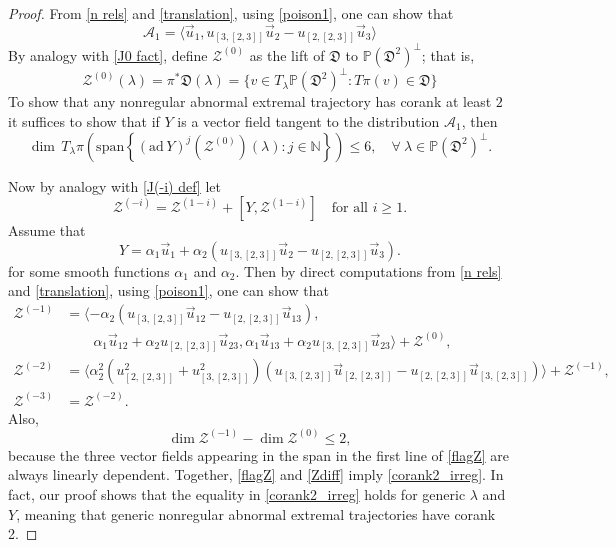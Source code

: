 \documentclass[11pt,letterpaper]{amsart}
\numberwithin{equation}{section}
\begin{document}
\begin{proof}
From \eqref{n rels} and \eqref{translation}, using \eqref{poison1}, one can show that 
\begin{equation}
\label{C1-quasi}
\mathcal A_1=\langle \vec u_1, u_{[3, [2,3]]} \vec u_2-u_{[2,[2,3]]}\vec u_3\rangle
\end{equation}
By analogy with \eqref{J0 fact}, define $\mathcal Z^{(0)}$ as the lift of $\mathfrak D$ to $\mathbb P(\mathfrak D^2)^\perp$; that is,
\begin{equation}
    \label{Z0 fact}
    \mathcal{Z}^{(0)}(\lambda) = \pi^*\mathfrak D(\lambda)=\{v\in T_\lambda \mathbb P(\mathfrak D^2)^\perp: T\pi(v) \in \mathfrak D\}
\end{equation}To show that any nonregular abnormal extremal trajectory has corank at least $2$ it suffices to show that if $Y$ is a vector field tangent to the distribution $\mathcal A_1$, then 
\begin{equation}
\label{corank2_irreg}
\dim \,T_\lambda\pi\left(\mathrm{span}\left \{(\mathrm{ad}\, Y)^j (\mathcal Z^{(0)})(\lambda):j\in \mathbb N\right\}\right)\leq 6,\quad  \forall\ \lambda \in  \mathbb P(\mathfrak D^2)^\perp.
\end{equation}

Now by analogy with \eqref{J(-i) def} let 
\begin{equation}
\label{Z(-i) def}
    \mathcal{Z}^{(-i)} = \mathcal{Z}^{(1-i)} + [Y,\mathcal{Z}^{(1-i)}]\quad\text{for all }i\geq 1.
    \end{equation}
Assume that 
\[
    Y=\alpha_1  \vec u_1 +\alpha_2 (u_{[3, [2,3]]} \vec u_2-u_{[2,[2,3]]}\vec u_3).
\]
for some smooth functions $\alpha_1$ and $\alpha_2$. Then by direct computations from \eqref{n rels} and \eqref{translation}, using \eqref{poison1}, one can show that
\begin{align}
\mathcal{Z}^{(-1)}&=
\langle -\alpha_2(u_{[3,[2,3]]} \vec u_{12}-u_{[2,[2,3]]}\vec u_{13}), 
\\
&\quad\quad\alpha _1 \vec u_{12}+\alpha_2 u_{[2, [2,3]]} \vec u_{23}, \alpha _1 \vec u_{13}+\alpha_2 u_{[3, [2,3]]} \vec u_{23} \rangle+ \mathcal{Z}^{(0)},
\\
\label{flagZ}
\mathcal{Z}^{(-2)}&=\langle\alpha_2^2(u_{[2,[2,3]]}^2+u_{[3,[2,3]]}^2)(u_{[3,[2,3]]}\vec u_{[2,[2,3]]}-u_{[2,[2,3]]}\vec u_{[3,[2,3]]})\rangle+\mathcal Z^{(-1)},
\\
\mathcal Z^{(-3)}&=\mathcal Z^{(-2)}.
\end{align}
Also, 
\begin{equation}
\label{Zdiff}
\dim \mathcal Z^{(-1)}-\dim \mathcal Z^{(0)}\leq 2,
\end{equation}
because the three vector fields appearing in the span in the first line of \eqref{flagZ} are always linearly dependent. Together, \eqref{flagZ} and \eqref{Zdiff} imply \eqref{corank2_irreg}.
In fact, our proof shows that the equality in \eqref{corank2_irreg} holds for generic $\lambda$ and $Y$, meaning that generic nonregular abnormal extremal trajectories have corank 2.
\end{proof}
\end{document}
